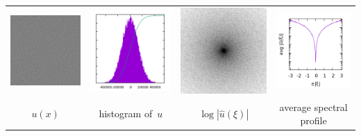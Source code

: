 \begin{tabular}{cccc}
	\includegraphics{KK+2.png} &
	\includegraphics{KK+2_h.png} &
	\includegraphics{KK+2_f.png} &
	\includegraphics{KK+2_p.png} \\
	$u(x)$ &
	histogram of~$u$ &
	$\log|\hat u(\xi)|$ &
	average spectral profile
\end{tabular}
